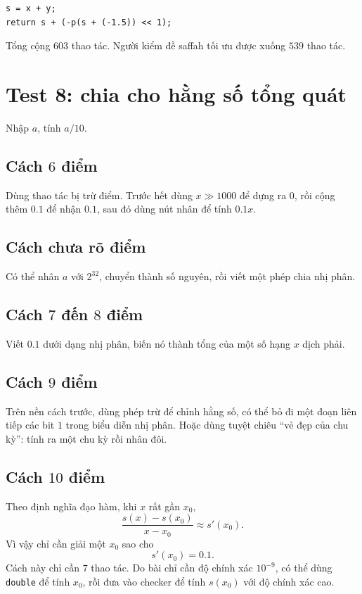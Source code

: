\documentclass[11pt]{article}
\begin{document}
\begin{verbatim}
s = x + y;
return s + (-p(s + (-1.5)) << 1);
\end{verbatim}

Tổng cộng $603$ thao tác. Người kiểm đề saffah tối ưu được xuống $539$ thao
tác.

\section{Test 8: chia cho hằng số tổng quát}

Nhập $a$, tính $a/10$.

\subsection*{Cách $6$ điểm}

Dùng thao tác bị trừ điểm. Trước hết dùng $x\gg 1000$ để dựng ra $0$, rồi
cộng thêm $0.1$ để nhận $0.1$, sau đó dùng nút nhân để tính $0.1x$.

\subsection*{Cách chưa rõ điểm}

Có thể nhân $a$ với $2^{32}$, chuyển thành số nguyên, rồi viết một phép chia
nhị phân.

\subsection*{Cách $7$ đến $8$ điểm}

Viết $0.1$ dưới dạng nhị phân, biến nó thành tổng của một số hạng $x$ dịch
phải.

\subsection*{Cách $9$ điểm}

Trên nền cách trước, dùng phép trừ để chỉnh hằng số, có thể bỏ đi một đoạn
liên tiếp các bit $1$ trong biểu diễn nhị phân. Hoặc dùng tuyệt chiêu ``vẻ đẹp
của chu kỳ'': tính ra một chu kỳ rồi nhân đôi.

\subsection*{Cách $10$ điểm}

Theo định nghĩa đạo hàm, khi $x$ rất gần $x_0$,
\[
  \frac{s(x)-s(x_0)}{x-x_0}\approx s'(x_0).
\]
Vì vậy chỉ cần giải một $x_0$ sao cho
\[
  s'(x_0)=0.1.
\]
Cách này chỉ cần $7$ thao tác. Do bài chỉ cần độ chính xác $10^{-9}$, có thể
dùng \texttt{double} để tính $x_0$, rồi đưa vào checker để tính
$s(x_0)$ với độ chính xác cao.
\end{document}
